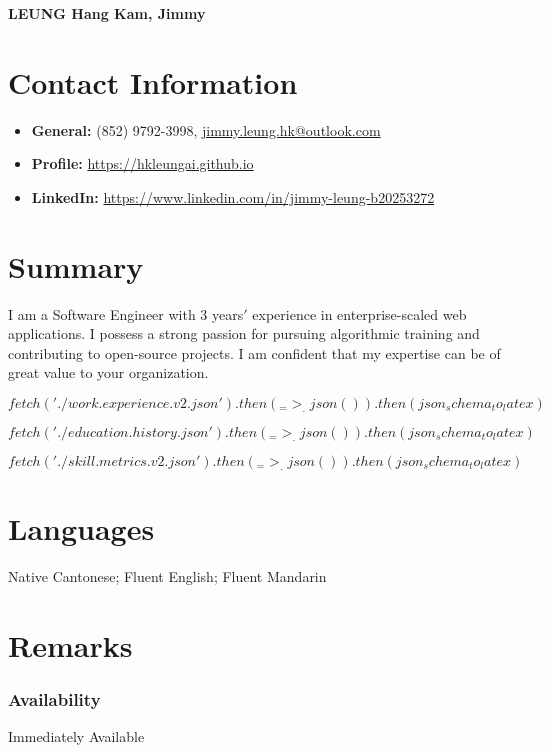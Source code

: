 \documentclass[a4paper, 12pt]{report}
\newcommand{\subheading}[1]{\subsubsection*{#1}}
\newcommand{\heading}[1]{\section*{#1}}
\begin{document}
\begin{center}
    \textbf{\LARGE LEUNG Hang Kam, Jimmy}
\end{center}

\def\mobile{\leavevmode\hbox to7bp{\kern1bp \lower1bp\vbox to12bp{}%
    \pdfliteral{q 0 g 0 G 1 j 2 w 0 0 5 10 re B
       1 g 1 G 1 w .3 1.8 4.4 7 re B 
       1.5 w 2.5 .2 0 .1 re B .3 w 1.7 10 1.6 0 re B Q}%
    \hss}}

\heading{Contact Information}
	
\begin{itemize}
    \setlength\itemsep{0pt}
    \setlength\parsep{0pt}
    \item \textbf{General:} (852) 9792-3998, \href{mailto:jimmy.leung.hk@outlook.com}{jimmy.leung.hk@outlook.com}
    \item \textbf{Profile:} \href{https://hkleungai.github.io}{\url{https://hkleungai.github.io}}
	\item \textbf{LinkedIn:} \href{https://www.linkedin.com/in/jimmy-leung-b20253272}{\url{https://www.linkedin.com/in/jimmy-leung-b20253272}}
\end{itemize}

\heading{Summary}
I am a Software Engineer with 3 years$'$ experience in enterprise-scaled web applications.
I possess a strong passion for pursuing algorithmic training and contributing to open-source projects.
I am confident that my expertise can be of great value to your organization.

$${fetch('./work.experience.v2.json').then(_ => _.json()).then(json_schema_to_latex)}$$

$${fetch('./education.history.json').then(_ => _.json()).then(json_schema_to_latex)}$$

$${fetch('./skill.metrics.v2.json').then(_ => _.json()).then(json_schema_to_latex)}$$

\heading{Languages}

Native Cantonese; Fluent English; Fluent Mandarin

\heading{Remarks}

\subheading{Availability}

Immediately Available
\end{document}
